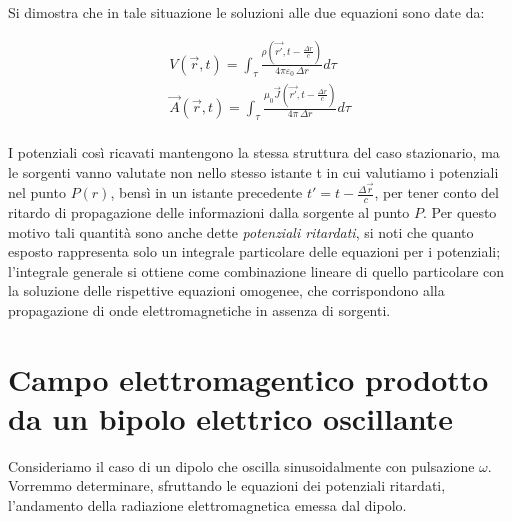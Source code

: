 \begin{figure}[htpb]
\end{figure}
\FloatBarrier

Si dimostra che in tale situazione le soluzioni alle due equazioni sono date da:

\begin{gather*}
	\boxed{V(\vec{r},t) = \int_{\tau}\frac{\rho (\vec{r'}, t - \frac{\Delta r}{c})}{4\pi \varepsilon_0 \, \Delta r}d\tau} \\
	\boxed{\vec{A} (\vec{r},t) = \int_{\tau}\frac{\mu_0 \vec{J} (\vec{r'}, t - \frac{\Delta r}{c})}{4\pi \, \Delta r}d\tau} \\
\end{gather*}

I potenziali così ricavati mantengono la stessa struttura del caso stazionario, ma le sorgenti vanno valutate non nello stesso istante t in cui valutiamo i potenziali nel punto $P(r)$, bensì in un istante precedente $ t'=t-\frac{\Delta \vec{r}}{c} $, per tener conto del ritardo di propagazione delle informazioni dalla sorgente al punto $P$. Per questo motivo tali quantità sono anche dette \emph{potenziali ritardati}, si noti che quanto esposto rappresenta solo un integrale particolare delle equazioni per i potenziali; l'integrale generale si ottiene come combinazione lineare di quello particolare con la soluzione delle rispettive equazioni omogenee, che corrispondono alla propagazione di onde elettromagnetiche in assenza di sorgenti.

\section{Campo elettromagentico prodotto da un bipolo elettrico oscillante}

Consideriamo il caso di un dipolo che oscilla sinusoidalmente con pulsazione $\omega$. Vorremmo determinare, sfruttando le equazioni dei potenziali ritardati, l'andamento della radiazione elettromagnetica emessa dal dipolo.

